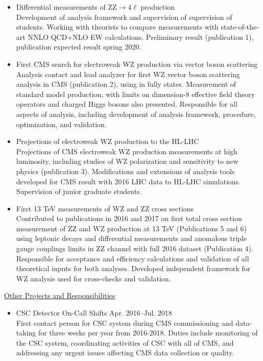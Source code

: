 \documentclass[10pt]{res} %
\begin{document}
\begin{resume}
\begin{itemize}
  \item{Differential measurements of ZZ$\to4\ell$ production} \\
    Development of analysis framework and supervision of supervision of students.
    Working with theorists to compare measurements with state-of-the-art NNLO QCD+NLO EW
    calculations. Preliminary result (publication 1), publication expected result spring 2020.
  \item{First CMS search for electroweak WZ production via vector boson scattering} \\
    Analysis contact and lead analyzer for first WZ vector boson scattering analysis in CMS (publication 2),
    using in fully states. 
    Measurement of standard model production, with limits on dimension-8 
    effective field theory operators and charged Higgs bosons also presented.
    Responsible for all aspects of analysis, 
    including development of analysis framework, procedure, optimization, and validation. 

  \item{Projections of electroweak WZ production to the HL-LHC} \\
    Projections of CMS electroweak WZ production measurements at high luminosity, including studies of
    WZ polarization and sensitivity to new physics (publication 3). 
    Modifications and extensions of analysis tools developed for CMS result with 2016 LHC data to 
    HL-LHC simulations. Supervision of junior graduate students.

  \item{First 13 TeV measurements of WZ and ZZ cross sections} \\
    Contributed to publications in 2016 and 2017 on first total cross section measurement 
    of ZZ and WZ production at 13 TeV (Publications 5 and 6) using leptonic decays
    and differential measurements and anomalous
    triple gauge couplings limits in ZZ channel
    with full 2016 dataset (Publication 4). 
    Responsible for acceptance
    and efficiency calculations and validation of all theoretical inputs for both analyses. 
    Developed independent framework for WZ analysis used for cross-checks and validation.

\end{itemize}

\underline{Other Projects and Responsibilities}
\vspace{2mm}
\begin{itemize}
  \item CSC Detector On-Call Shifts \hfill{Apr. 2016--Jul. 2018} \\
    First contact person for CSC system during CMS commissioning and data-taking for three weeks per year
    from 2016-2018. Duties include monitoring of the CSC system, coordinating activities of CSC with all of CMS, 
    and addressing any urgent issues affecting CMS data collection or quality.


\end{itemize}
\end{resume}
\end{document}
